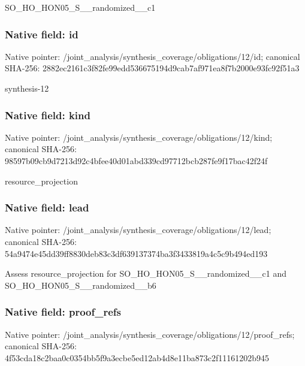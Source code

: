 \documentclass[10pt,a4paper]{article}
\begin{document}
\begingroup\raggedright\sloppy SO\_\allowbreak{}HO\_\allowbreak{}HON05\_\allowbreak{}S\_\allowbreak{}\_\allowbreak{}randomized\_\allowbreak{}\_\allowbreak{}c1\par\endgroup

\subsubsection{Native field: id}
Native pointer: /joint\_\allowbreak{}analysis/synthesis\_\allowbreak{}coverage/obligations/12/id; canonical SHA-256: 2882ec2161c3f82fe99edd536675194d9cab7af971ea8f7b2000e93fc92f51a3

\begingroup\raggedright\sloppy synthesis-12\par\endgroup

\subsubsection{Native field: kind}
Native pointer: /joint\_\allowbreak{}analysis/synthesis\_\allowbreak{}coverage/obligations/12/kind; canonical SHA-256: 98597b09cb9d7213d92c4bfee40d01abd339cd97712bcb287fe9f17bac42f24f

\begingroup\raggedright\sloppy resource\_\allowbreak{}projection\par\endgroup

\subsubsection{Native field: lead}
Native pointer: /joint\_\allowbreak{}analysis/synthesis\_\allowbreak{}coverage/obligations/12/lead; canonical SHA-256: 54a9474e45dd39ff8830deb83c3df639137374ba3f3433819a4c5c9b494ed193

\begingroup\raggedright\sloppy Assess resource\_\allowbreak{}projection for SO\_\allowbreak{}HO\_\allowbreak{}HON05\_\allowbreak{}S\_\allowbreak{}\_\allowbreak{}randomized\_\allowbreak{}\_\allowbreak{}c1 and SO\_\allowbreak{}HO\_\allowbreak{}HON05\_\allowbreak{}S\_\allowbreak{}\_\allowbreak{}randomized\_\allowbreak{}\_\allowbreak{}b6\par\endgroup

\subsubsection{Native field: proof\_\allowbreak{}refs}
Native pointer: /joint\_\allowbreak{}analysis/synthesis\_\allowbreak{}coverage/obligations/12/proof\_\allowbreak{}refs; canonical SHA-256: 4f53cda18c2baa0c0354bb5f9a3ecbe5ed12ab4d8e11ba873c2f11161202b945
\end{document}
